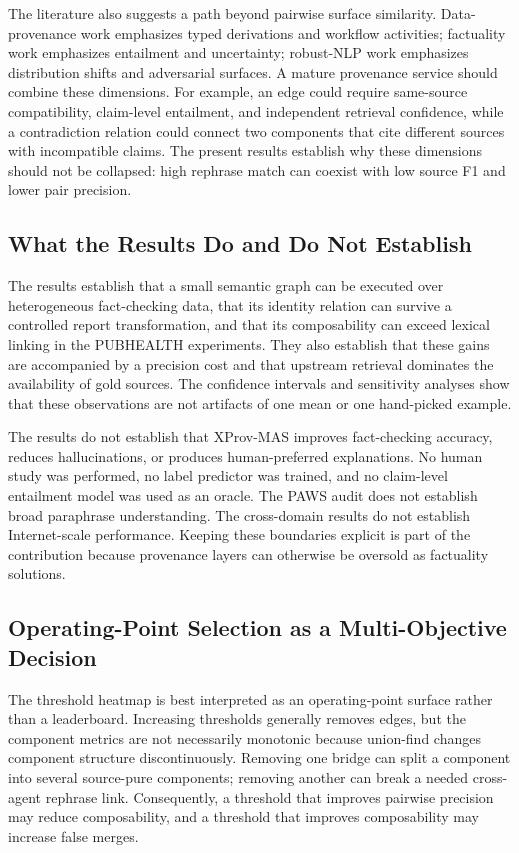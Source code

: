 \documentclass{ieeeaccess}
\begin{document}
The literature also suggests a path beyond pairwise surface similarity. Data-provenance work emphasizes typed derivations and workflow activities; factuality work emphasizes entailment and uncertainty; robust-NLP work emphasizes distribution shifts and adversarial surfaces. A mature provenance service should combine these dimensions. For example, an edge could require same-source compatibility, claim-level entailment, and independent retrieval confidence, while a contradiction relation could connect two components that cite different sources with incompatible claims. The present results establish why these dimensions should not be collapsed: high rephrase match can coexist with low source F1 and lower pair precision.

\subsection{What the Results Do and Do Not Establish}
The results establish that a small semantic graph can be executed over heterogeneous fact-checking data, that its identity relation can survive a controlled report transformation, and that its composability can exceed lexical linking in the PUBHEALTH experiments. They also establish that these gains are accompanied by a precision cost and that upstream retrieval dominates the availability of gold sources. The confidence intervals and sensitivity analyses show that these observations are not artifacts of one mean or one hand-picked example.

The results do not establish that XProv-MAS improves fact-checking accuracy, reduces hallucinations, or produces human-preferred explanations. No human study was performed, no label predictor was trained, and no claim-level entailment model was used as an oracle. The PAWS audit does not establish broad paraphrase understanding. The cross-domain results do not establish Internet-scale performance. Keeping these boundaries explicit is part of the contribution because provenance layers can otherwise be oversold as factuality solutions.

\subsection{Operating-Point Selection as a Multi-Objective Decision}
The threshold heatmap is best interpreted as an operating-point surface rather than a leaderboard. Increasing thresholds generally removes edges, but the component metrics are not necessarily monotonic because union-find changes component structure discontinuously. Removing one bridge can split a component into several source-pure components; removing another can break a needed cross-agent rephrase link. Consequently, a threshold that improves pairwise precision may reduce composability, and a threshold that improves composability may increase false merges.
\end{document}
